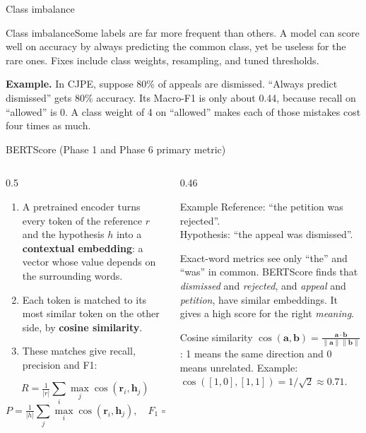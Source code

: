 \documentclass[aspectratio=169,11pt]{beamer}
\newcommand{\term}[3]{%
  \begin{block}{#1}\small #2\par\vspace{1mm}%
  {\color{exgreen}\textbf{Example.}} #3\end{block}}
\begin{document}
\begin{frame}{Class imbalance}
  \term{Class imbalance}
  {Some labels are far more frequent than others. A model can score well on accuracy by always predicting the common class, yet be useless for the rare ones. Fixes include class weights, resampling, and tuned thresholds.}
  {In CJPE, suppose 80\% of appeals are dismissed. ``Always predict dismissed'' gets 80\% accuracy. Its Macro-F1 is only about 0.44, because recall on ``allowed'' is 0. A class weight of 4 on ``allowed'' makes each of those mistakes cost four times as much.}
\end{frame}

\begin{frame}{BERTScore (Phase 1 and Phase 6 primary metric)}
  \begin{columns}[T]
    \begin{column}{0.5\textwidth}
      \small
      \begin{enumerate}
        \item A pretrained encoder turns every token of the reference $r$ and the hypothesis $h$ into a \textbf{contextual embedding}: a vector whose value depends on the surrounding words.
        \item Each token is matched to its most similar token on the other side, by \textbf{cosine similarity}.
        \item These matches give recall, precision and F1:
      \end{enumerate}
      \[ R=\tfrac1{|r|}\textstyle\sum_{i}\max_j\cos(\mathbf r_i,\mathbf h_j) \]
      \[ P=\tfrac1{|h|}\textstyle\sum_{j}\max_i\cos(\mathbf r_i,\mathbf h_j),\quad F_1=\tfrac{2PR}{P+R} \]
    \end{column}
    \begin{column}{0.46\textwidth}
      \begin{exampleblock}{Example}
        \small
        Reference: ``the petition was rejected''.\\
        Hypothesis: ``the appeal was dismissed''.
        \vspace{1mm}

        Exact-word metrics see only ``the'' and ``was'' in common.
        BERTScore finds that \emph{dismissed} and \emph{rejected}, and \emph{appeal} and \emph{petition}, have similar embeddings.
        It gives a high score for the right \emph{meaning}.
      \end{exampleblock}
      \begin{block}{Cosine similarity}
        \small
        $\cos(\mathbf a,\mathbf b)=\frac{\mathbf a\cdot\mathbf b}{\|\mathbf a\|\|\mathbf b\|}$: 1 means the same direction and 0 means unrelated. Example: $\cos([1,0],[1,1])=1/\sqrt2\approx0.71$.
      \end{block}
    \end{column}
  \end{columns}
\end{frame}
\end{document}
